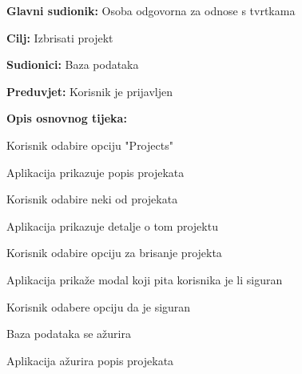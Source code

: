 					\noindent {}
					\begin{packed_item}
					
						\item \textbf{Glavni sudionik:} Osoba odgovorna za odnose s tvrtkama
						\item \textbf{Cilj:} Izbrisati projekt
						\item \textbf{Sudionici:} Baza podataka
						\item \textbf{Preduvjet:} Korisnik je prijavljen
						\item \textbf{Opis osnovnog tijeka:}
					
						\item[] \begin{packed_enum}

							\item Korisnik odabire opciju "Projects"
							\item Aplikacija prikazuje popis projekata
							\item Korisnik odabire neki od projekata
							\item Aplikacija prikazuje detalje o tom projektu
							\item Korisnik odabire opciju za brisanje projekta
							\item Aplikacija prikaže modal koji pita korisnika je li siguran
							\item Korisnik odabere opciju da je siguran
							\item Baza podataka se ažurira
							\item Aplikacija ažurira popis projekata
						\end{packed_enum}
					
					\end{packed_item}

